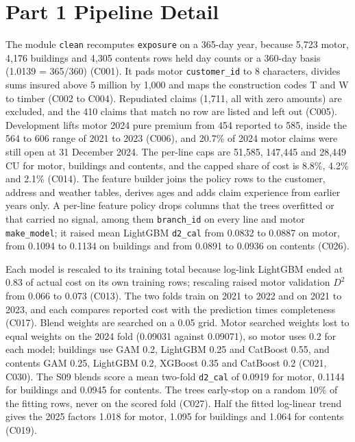 \section{Part 1 Pipeline Detail}
\label{ov:app-p1}

The module \texttt{clean} recomputes \texttt{exposure} on a 365-day year, because 5,723 motor, 4,176 buildings and
4,305 contents rows held day counts or a 360-day basis (1.0139 = 365/360) (C001). It pads motor \texttt{customer\_id} to 8
characters, divides sums insured above 5 million by 1,000 and maps the construction codes T and W to timber (C002 to
C004). Repudiated claims (1,711, all with zero amounts) are excluded, and the 410 claims that match no row are listed
and left out (C005). Development lifts motor 2024 pure premium from 454 reported to 585, inside the 564 to 606 range
of 2021 to 2023 (C006), and 20.7\% of 2024 motor claims were still open at 31 December 2024. The per-line caps are 51,585,
147,445 and 28,449 CU for motor, buildings and contents, and the capped share of cost is 8.8\%, 4.2\% and 2.1\% (C014).
The feature builder joins the policy rows to the customer, address and weather tables, derives ages and adds claim
experience from earlier years only. A per-line feature policy drops columns that the trees overfitted or that carried no signal, among them
\texttt{branch\_id} on every line and motor \texttt{make\_model}; it raised mean LightGBM \texttt{d2\_cal} from 0.0832 to 0.0887 on motor, from 0.1094 to 0.1134 on
buildings and from 0.0891 to 0.0936 on contents (C026).

Each model is rescaled to its training total because log-link LightGBM ended at 0.83 of actual cost on its own training
rows; rescaling raised motor validation $D^2$ from 0.066 to 0.073 (C013). The two folds train on 2021 to 2022 and on
2021 to 2023, and each compares reported cost with the prediction times completeness (C017). Blend weights are searched
on a 0.05 grid. Motor searched weights lost to equal weights on the 2024 fold (0.09031 against 0.09071), so motor uses
0.2 for each model; buildings use GAM 0.2, LightGBM 0.25 and CatBoost 0.55, and contents GAM 0.25, LightGBM 0.2,
XGBoost 0.35 and CatBoost 0.2 (C021, C030). The S09 blends score a mean two-fold \texttt{d2\_cal} of 0.0919 for motor,
0.1144 for buildings and 0.0945 for contents. The trees early-stop on a random 10\% of the fitting rows, never on
the scored fold (C027). Half the fitted log-linear trend gives the 2025 factors 1.018 for motor, 1.095 for buildings
and 1.064 for contents (C019).

